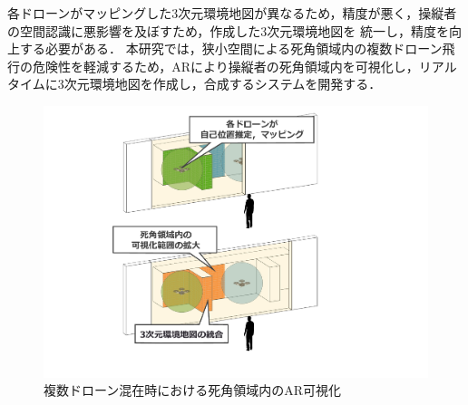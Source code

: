 \documentclass[a4paper,10pt,twocolumn,uplatex]{jsarticle}
\begin{document}
各ドローンがマッピングした3次元環境地図が異なるため，精度が悪く，操縦者の空間認識に悪影響を及ぼすため，作成した3次元環境地図を
統一し，精度を向上する必要がある．
本研究では，狭小空間による死角領域内の複数ドローン飛行の危険性を軽減するため，ARにより操縦者の死角領域内を可視化し，リアルタイムに3次元環境地図を作成し，合成するシステムを開発する．


\begin{figure}[!tb]
  \centering
  \includegraphics[width=\linewidth]{img/outline.pdf}
  \caption{複数ドローン混在時における死角領域内のAR可視化}
  \label{fig:sample1}
\end{figure}


\end{document}
